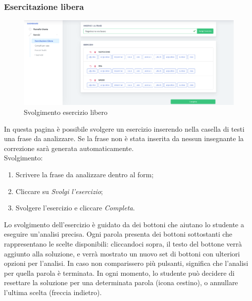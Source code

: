         \subsubsection{Esercitazione libera}      
        	\begin{figure}[H]
                \centering
                \includegraphics[width=17cm]{sez/img/studente/esercitazioneLiberaEsegui.PNG} 
                \caption{Svolgimento esercizio libero}\label{fig:1}
        	\end{figure}
          In questa pagina è possibile svolgere un esercizio inserendo nella casella di testi una frase da analizzare.
          Se la frase non è stata inserita da nessun insegnante la 
        correzione sarà generata automaticamente.
        \\ Svolgimento:
        	\begin{enumerate}        
            	\item Scrivere la frase da analizzare dentro al form;
            	\item Cliccare su \textit{Svolgi l'esercizio};
            	\item Svolgere l'esercizio e cliccare \textit{Completa}.
        	\end{enumerate}
        	\label{sec:esLib}
        	Lo svolgimento dell'esercizio è guidato da dei bottoni che aiutano lo studente a eseguire un'analisi precisa. Ogni parola presenta dei bottoni sottostanti che rappresentano le scelte disponibili: cliccandoci sopra, il testo del bottone verrà aggiunto alla soluzione, e verrà mostrato un nuovo set di bottoni con ulteriori opzioni per l'analisi. In caso non comparissero più pulsanti, significa che l'analisi per quella parola è terminata. In ogni momento, lo studente può decidere di resettare la soluzione per una determinata parola (icona cestino), o annullare l'ultima scelta (freccia indietro).

      
        \newpage
